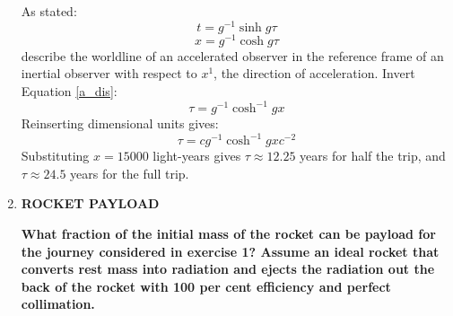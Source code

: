 \documentclass[9pt]{report}
\begin{document}
\begin{enumerate}
As stated:
\begin{equation}
    t = g^{-1} \sinh g \tau
\end{equation}
\begin{equation}
    x = g^{-1} \cosh g \tau \label{a_dis}
\end{equation}
describe the worldline of an accelerated observer in the reference frame of an inertial observer
with respect to $x^1$, the direction of acceleration. Invert Equation \ref{a_dis}:
\[
  \tau = g^{-1} \cosh^{-1} gx
\]
Reinserting dimensional units gives:
\[
  \tau = c g^{-1} \cosh^{-1} gxc^{-2}
\]
Substituting $x=15000$ light-years gives $\tau \approx 12.25$ years for half the
trip, and $\tau \approx 24.5$ years for the full trip.

\item \textbf{ROCKET PAYLOAD}

\textbf{What fraction of the initial mass of the rocket can be payload for the
journey considered in exercise 1? Assume an ideal rocket that converts rest
mass into radiation and ejects the radiation out the back of the rocket with
100 per cent efficiency and perfect collimation.}


\end{enumerate}
\end{document}
